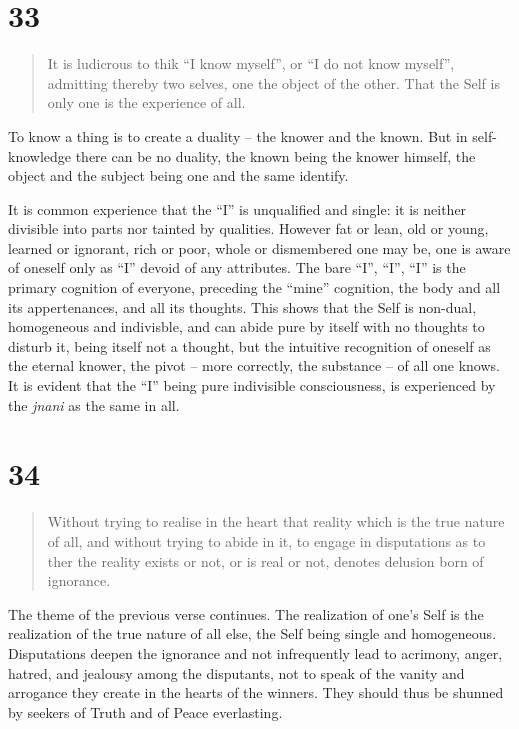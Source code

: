 \documentclass[12pt]{report}
\begin{document}
{\section*{33}

\begin{quote}
  It is ludicrous to thik ``I know myself'', or ``I do not know
  myself'', admitting thereby two selves, one the object of the
  other. That the Self is only one is the experience of all.
\end{quote}


To know a thing is to create a duality -- the knower and the
known. But in self-knowledge there can be no duality, the known being
the knower himself, the object and the subject being one and the same
identify.

It is common experience that the ``I'' is unqualified and single: it
is neither divisible into parts nor tainted by qualities. However fat
or lean, old or young, learned or ignorant, rich or poor, whole or
dismembered one may be, one is aware of oneself only as ``I'' devoid
of any attributes. The bare ``I'', ``I'', ``I'' is the primary
cognition of everyone, preceding the ``mine'' cognition, the body and
all its appertenances, and all its thoughts. This shows that the Self
is non-dual, homogeneous and indivisble, and can abide pure by itself
with no thoughts to disturb it, being itself not a thought, but the
intuitive recognition of oneself as the eternal knower, the pivot --
more correctly, the substance -- of all one knows. It is evident that
the ``I'' being pure indivisible consciousness, is experienced by the
\emph{jnani} as the same in all.

\section*{34}

\begin{quote}
  Without trying to realise in the heart that reality which is the
  true nature of all, and without trying to abide in it, to engage in
  disputations as to ther the reality exists or not, or is real or
  not, denotes delusion born of ignorance.
\end{quote}


The theme of the previous verse continues. The realization of one's
Self is the realization of the true nature of all else, the Self being
single and homogeneous. Disputations deepen the ignorance and not
infrequently lead to acrimony, anger, hatred, and jealousy among the
disputants, not to speak of the vanity and arrogance they create in
the hearts of the winners. They should thus be shunned by seekers of
Truth and of Peace everlasting.

}
\end{document}
